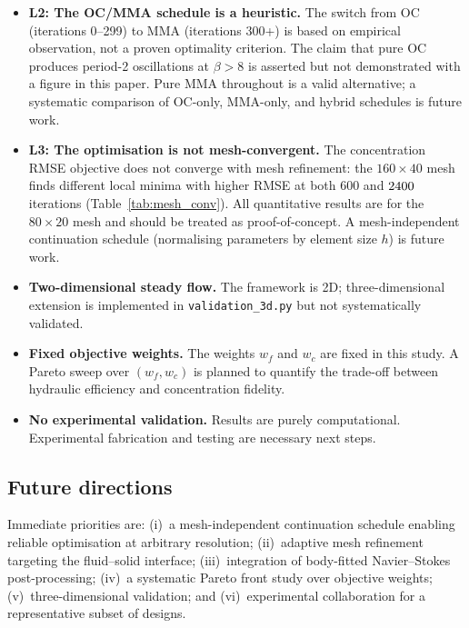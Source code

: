 \begin{itemize}
          \texttt{ns\_validation.py} but requires \texttt{pyvista} and
          \texttt{gmsh} dependencies not present in the standard Docker
          image; these results are deferred to a companion study.
    \item \textbf{L2: The OC/MMA schedule is a heuristic.}
          The switch from OC (iterations 0--299) to MMA
          (iterations 300+) is based on empirical observation,
          not a proven optimality criterion.
          The claim that pure OC produces period-2 oscillations
          at $\beta>8$ is asserted but not demonstrated with
          a figure in this paper.
          Pure MMA throughout is a valid alternative;
          a systematic comparison of OC-only, MMA-only,
          and hybrid schedules is future work.
    \item \textbf{L3: The optimisation is not mesh-convergent.}
          The concentration RMSE objective does not converge
          with mesh refinement: the $160\times40$ mesh finds
          different local minima with higher RMSE at both
          600 and $2400$ iterations
          (Table~\ref{tab:mesh_conv}).
          All quantitative results are for the $80\times20$ mesh
          and should be treated as proof-of-concept.
          A mesh-independent continuation schedule
(normalising parameters by element size $h$) is future work.
    \item \textbf{Two-dimensional steady flow.}
          The framework is 2D; three-dimensional extension is implemented
          in \texttt{validation\_3d.py} but not systematically validated.
    \item \textbf{Fixed objective weights.}
          The weights $w_f$ and $w_c$ are fixed in this study.
          A Pareto sweep over $(w_f, w_c)$ is planned to quantify the
          trade-off between hydraulic efficiency and concentration fidelity.
    \item \textbf{No experimental validation.}
          Results are purely computational.
          Experimental fabrication and testing are necessary next steps.
\end{itemize}



\subsection{Future directions}
Immediate priorities are: (i)~a mesh-independent continuation schedule
enabling reliable optimisation at arbitrary resolution;
(ii)~adaptive mesh refinement targeting the fluid--solid interface;
(iii)~integration of body-fitted Navier--Stokes post-processing;
(iv)~a systematic Pareto front study over objective weights;
(v)~three-dimensional validation;
and (vi)~experimental collaboration for a representative subset of designs.
